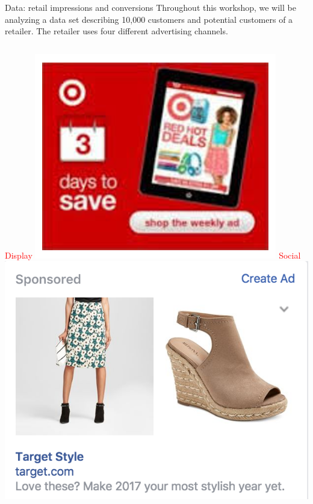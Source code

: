 \documentclass[10pt, aspectratio=169]{beamer}
\begin{document}
\begin{frame}{Data: retail impressions and conversions}
Throughout this workshop, we will be analyzing a data set describing 10,000 customers and potential customers of a retailer. The retailer uses four different advertising channels. 
\begin{columns}[T]
\centering
\textcolor{red}{Display}
\includegraphics[width=\textwidth]{images/target_display.png} 
\centering
\textcolor{red}{Social}
\includegraphics[width=\textwidth]{images/target_social.png}

\end{columns}
\end{frame}
\end{document}
